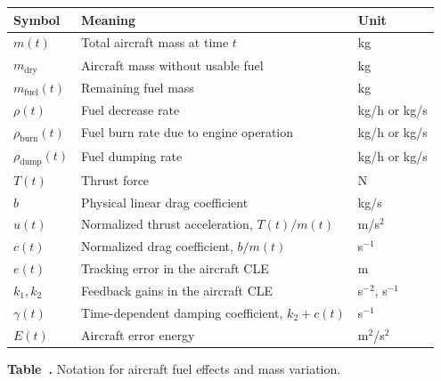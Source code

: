 ﻿\documentclass[12pt]{article}
\begin{document}
\begin{center}
\label{tab:fuel-notation}
\centering
\renewcommand{\arraystretch}{1.25}
\begin{tabular}{|>{\centering\arraybackslash}p{2.4cm}|>{\raggedright\arraybackslash}p{8.8cm}|>{\centering\arraybackslash}p{2.4cm}|}
\hline
\textbf{Symbol} & \textbf{Meaning} & \textbf{Unit} \\
\hline
$m(t)$ & Total aircraft mass at time $t$ & kg \\
\hline
$m_{\mathrm{dry}}$ & Aircraft mass without usable fuel & kg \\
\hline
$m_{\mathrm{fuel}}(t)$ & Remaining fuel mass & kg \\
\hline
$\rho(t)$ & Fuel decrease rate & kg/h or kg/s \\
\hline
$\rho_{\mathrm{burn}}(t)$ & Fuel burn rate due to engine operation & kg/h or kg/s \\
\hline
$\rho_{\mathrm{dump}}(t)$ & Fuel dumping rate & kg/h or kg/s \\
\hline
$T(t)$ & Thrust force & N \\
\hline
$b$ & Physical linear drag coefficient & kg/s \\
\hline
$u(t)$ & Normalized thrust acceleration, $T(t)/m(t)$ & m/s$^2$ \\
\hline
$c(t)$ & Normalized drag coefficient, $b/m(t)$ & s$^{-1}$ \\
\hline
$e(t)$ & Tracking error in the aircraft CLE & m \\
\hline
$k_1, k_2$ & Feedback gains in the aircraft CLE & s$^{-2}$, s$^{-1}$ \\
\hline
$\gamma(t)$ & Time-dependent damping coefficient, $k_2 + c(t)$ & s$^{-1}$ \\
\hline
$E(t)$ & Aircraft error energy & m$^2$/s$^2$ \\
\hline
\end{tabular}
\par\smallskip
\textbf{Table~\thetable.} Notation for aircraft fuel effects and mass variation.
\end{center}
\end{document}
